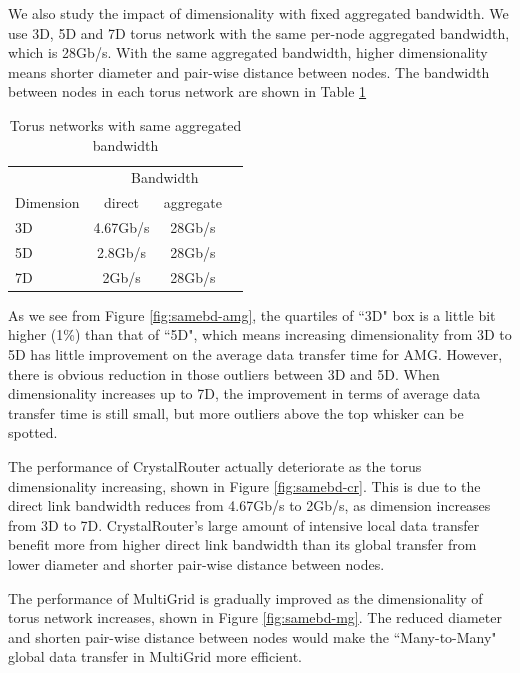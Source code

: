 \documentclass[conference]{IEEEtran}
\begin{document}
We also study the impact of dimensionality with fixed aggregated bandwidth. We use 3D, 5D and 7D torus network with the same per-node aggregated bandwidth, which is 28Gb/s. With the same aggregated bandwidth, higher dimensionality means shorter diameter and pair-wise distance between nodes. The bandwidth between nodes in each torus network are shown in Table \ref{tab: fix-bandwidth}

\begin{table}[ht]
\begin{center}
\caption{Torus networks with same aggregated bandwidth} 
\label{tab: fix-bandwidth}
\begin{tabular}{l c c c} 
\toprule %
\toprule
&\multicolumn{3}{c}{Bandwidth } \\
\cmidrule(l){2-4}
Dimension  & direct & aggregate &\\ %
\midrule %
3D      & 4.67Gb/s  & 28Gb/s  & \\  %
\midrule %
5D    & 2.8Gb/s  & 28Gb/s  &\\ %
\midrule %
7D    & 2Gb/s & 28Gb/s & \\
\midrule
\bottomrule %
\end{tabular}
\end{center}
\end{table}

As we see from Figure \ref{fig:samebd-amg}, the quartiles of ``3D" box is a little bit higher (1\%) than that of ``5D", which means increasing dimensionality from 3D to 5D has little improvement on the average data transfer time for AMG.  However, there is obvious reduction in those outliers between 3D and 5D. When dimensionality increases up to 7D, the improvement in terms of average data transfer time is still small, but more outliers above the top whisker can be spotted. 

The performance of CrystalRouter actually deteriorate as the torus dimensionality increasing, shown in Figure \ref{fig:samebd-cr}. This is due to the direct link bandwidth reduces from 4.67Gb/s to 2Gb/s, as dimension increases from 3D to 7D. CrystalRouter's large amount of intensive local data transfer benefit more from higher direct link bandwidth than its global transfer from lower diameter and shorter pair-wise distance between nodes. 

The performance of MultiGrid is gradually improved as the dimensionality of torus network increases, shown in Figure \ref{fig:samebd-mg}. The reduced diameter and shorten pair-wise distance between nodes would make the ``Many-to-Many" global data transfer in MultiGrid more efficient. 
\end{document}

